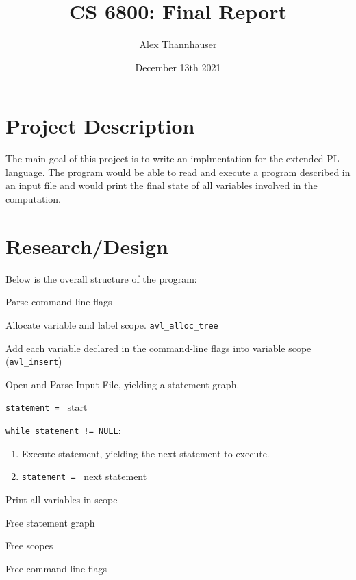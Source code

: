 \documentclass[letterpaper,11pt]{article}
\begin{document}
{
	\title{CS 6800: Final Report}
	\author{Alex Thannhauser}
	\date{December 13th 2021}

	\maketitle
	
	\section{Project Description}
	{
		The main goal of this project is to write an implmentation for the
		extended PL language. The program would be able to read and execute
		a program described in an input file and would print the final state of
		all variables involved in the computation.
	}
	
	\section{Research/Design}
	{
		Below is the overall structure of the program:
		\begin{enumerate}
		{
			\item Parse command-line flags
			\item Allocate variable and label scope. \texttt{avl\_alloc\_tree}
			\item Add each variable declared in the command-line flags into
				variable scope (\texttt{avl\_insert})
			\item Open and Parse Input File, yielding a statement graph.
			\item \texttt{statement = } start
			\item \texttt{while statement != NULL}:
			\begin{enumerate}
				\item Execute statement, yielding the next statement to execute.
				\item \texttt{statement = } next statement
			\end{enumerate}
			\item Print all variables in scope
			\item Free statement graph
			\item Free scopes
			\item Free command-line flags
		}
		\end{enumerate}
	}
	
}
\end{document}
